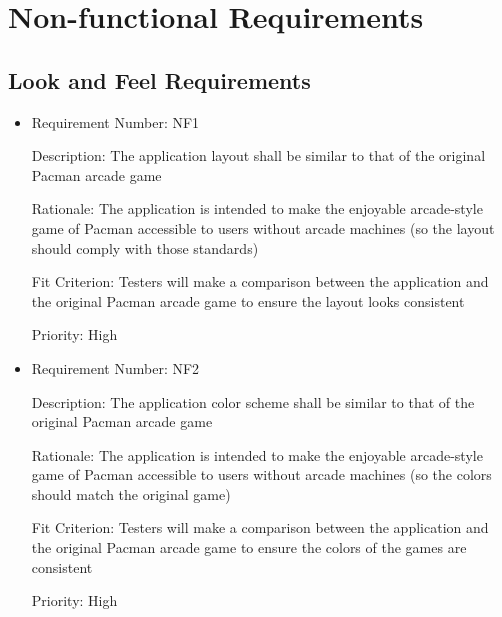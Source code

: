 \documentclass[12pt, titlepage]{article}
\begin{document}
\section{Non-functional Requirements}

\subsection{Look and Feel Requirements}
\begin{itemize}
	\item
	Requirement Number: NF1

	Description: The application layout shall be similar to that of the original Pacman arcade game

	Rationale: The application is intended to make the enjoyable arcade-style game of Pacman accessible to users without arcade machines (so the layout should comply with those standards)

	Fit Criterion: Testers will make a comparison between the application and the original Pacman arcade game to ensure the layout looks consistent

	Priority: High

	\item
	Requirement Number: NF2

	Description: The application color scheme shall be similar to that of the original Pacman arcade game

	Rationale: The application is intended to make the enjoyable arcade-style game of Pacman accessible to users without arcade machines (so the colors should match the original game)

	Fit Criterion: Testers will make a comparison between the application and the original Pacman arcade game to ensure the colors of the games are consistent

	Priority: High
\end{itemize}
\end{document}
